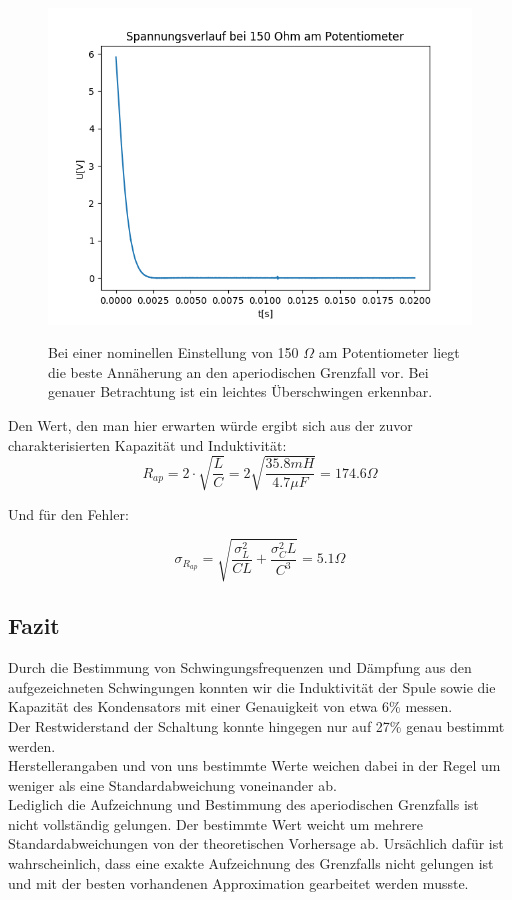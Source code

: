 \documentclass[12pt,a4paper]{article}
\begin{document}
\begin{figure}
\begin{center}
\includegraphics[scale=0.7]{Bilder/Spannungsverlauf150Ohm}
\label{fig:Aperiodisch}
\caption{Bei einer nominellen Einstellung von 150 $\Omega$ am Potentiometer liegt die beste Annäherung an den aperiodischen Grenzfall vor. Bei genauer Betrachtung ist ein leichtes Überschwingen erkennbar.}
\end{center}
\end{figure}


Den Wert, den man hier erwarten würde ergibt sich aus der zuvor charakterisierten Kapazität und Induktivität:
\begin{equation}
R_{ap}=2\cdot \sqrt{\frac{L}{C}}=2\sqrt{\frac{35.8mH}{4.7\mu F}}=174.6\Omega
\end{equation}

Und für den Fehler:

\begin{equation}
\sigma_{R_{ap}}=\sqrt{\frac{\sigma_L^2}{CL}+\frac{\sigma_C^2 L}{C^3}}=5.1 \Omega
\end{equation}

\subsection{Fazit}
Durch die Bestimmung von Schwingungsfrequenzen und Dämpfung aus den aufgezeichneten Schwingungen konnten wir die Induktivität der Spule sowie die Kapazität des Kondensators mit einer Genauigkeit von etwa 6\% messen.\\
Der Restwiderstand der Schaltung konnte hingegen nur auf 27\% genau bestimmt werden.\\
Herstellerangaben und von uns bestimmte Werte weichen dabei in der Regel um weniger als eine Standardabweichung voneinander ab.\\
Lediglich die Aufzeichnung und Bestimmung des aperiodischen Grenzfalls ist nicht vollständig gelungen. Der bestimmte Wert weicht um mehrere Standardabweichungen von der theoretischen Vorhersage ab. Ursächlich dafür ist wahrscheinlich, dass eine exakte Aufzeichnung des Grenzfalls nicht gelungen ist und mit der besten vorhandenen Approximation gearbeitet werden musste.
\end{document}
